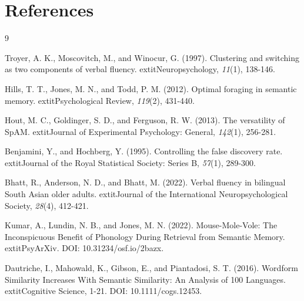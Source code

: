 \section{References}\label{references}

\begin{thebibliography}{9}

Troyer, A. K., Moscovitch, M., and Winocur, G. (1997).
Clustering and switching as two components of verbal fluency.
    extit{Neuropsychology}, \textit{11}(1), 138-146.

Hills, T. T., Jones, M. N., and Todd, P. M. (2012).
Optimal foraging in semantic memory.
    extit{Psychological Review}, \textit{119}(2), 431-440.

Hout, M. C., Goldinger, S. D., and Ferguson, R. W. (2013).
The versatility of SpAM.
    extit{Journal of Experimental Psychology: General}, \textit{142}(1), 256-281.

Benjamini, Y., and Hochberg, Y. (1995).
Controlling the false discovery rate.
    extit{Journal of the Royal Statistical Society: Series B}, \textit{57}(1), 289-300.

Bhatt, R., Anderson, N. D., and Bhatt, M. (2022).
Verbal fluency in bilingual South Asian older adults.
    extit{Journal of the International Neuropsychological Society}, \textit{28}(4), 412-421.

Kumar, A., Lundin, N. B., and Jones, M. N. (2022).
Mouse-Mole-Vole: The Inconspicuous Benefit of Phonology During Retrieval from Semantic Memory.
    extit{PsyArXiv}. DOI: 10.31234/osf.io/2bazx.

Dautriche, I., Mahowald, K., Gibson, E., and Piantadosi, S. T. (2016).
Wordform Similarity Increases With Semantic Similarity: An Analysis of 100 Languages.
    extit{Cognitive Science}, 1-21. DOI: 10.1111/cogs.12453.

\end{thebibliography}

